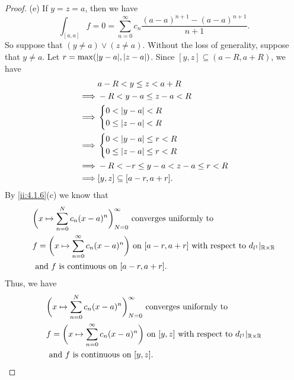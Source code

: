\begin{proof}{(e)}
  If \(y = z = a\), then we have
  \[
    \int_{[a, a]} f = 0 = \sum_{n = 0}^\infty c_n \dfrac{(a - a)^{n + 1} - (a - a)^{n + 1}}{n + 1}.
  \]
  So suppose that \((y \neq a) \lor (z \neq a)\).
  Without the loss of generality, suppose that \(y \neq a\).
  Let \(r = \max(\abs{y - a}, \abs{z - a})\).
  Since \([y, z] \subseteq (a - R, a + R)\), we have
  \begin{align*}
             & a - R < y \leq z < a + R              \\
    \implies & -R < y - a \leq z - a < R             \\
    \implies & \begin{dcases}
                 0 < \left\lvert y - a\right\rvert < R \\
                 0 \leq \left\lvert z - a\right\rvert < R
               \end{dcases}                 \\
    \implies & \begin{dcases}
                 0 < \left\lvert y - a\right\rvert \leq r < R \\
                 0 \leq \left\lvert z - a\right\rvert \leq r < R
               \end{dcases}          \\
    \implies & -R < -r \leq y - a < z - a \leq r < R \\
    \implies & [y, z] \subseteq [a - r, a + r].
  \end{align*}
  By \cref{ii:4.1.6}(c) we know that
  \begin{align*}
     & \bigg(x \mapsto \sum_{n = 0}^N c_n (x - a)^n\bigg)_{N = 0}^\infty \text{ converges uniformly to }                                       \\
     & f = \bigg(x \mapsto \sum_{n = 0}^\infty c_n (x - a)^n\bigg) \text{ on } [a - r, a + r] \text{ with respect to } d_{l^1}|_{\mathbb{R} \times \mathbb{R}} \\
     & \text{ and } f \text{ is continuous on } [a - r, a + r].
  \end{align*}
  Thus, we have
  \begin{align*}
     & \bigg(x \mapsto \sum_{n = 0}^N c_n (x - a)^n\bigg)_{N = 0}^\infty \text{ converges uniformly to }                               \\
     & f = \bigg(x \mapsto \sum_{n = 0}^\infty c_n (x - a)^n\bigg) \text{ on } [y, z] \text{ with respect to } d_{l^1}|_{\mathbb{R} \times \mathbb{R}} \\
     & \text{ and } f \text{ is continuous on } [y, z].
  \end{align*}

\end{proof}
